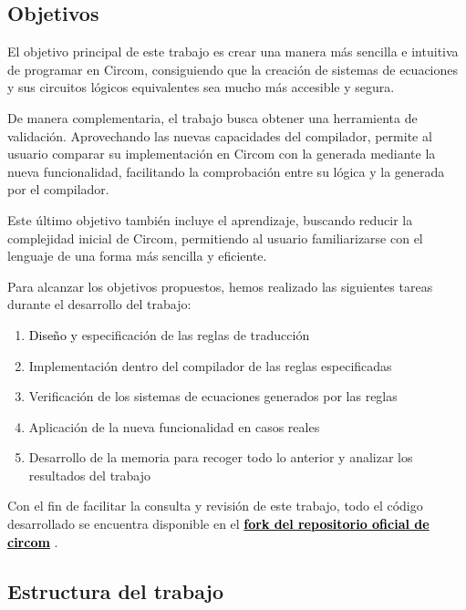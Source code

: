 \documentclass[a4paper,12pt]{report}
\begin{document}
	\subsection{Objetivos}
	
	\noindent El objetivo principal de este trabajo es crear una manera más sencilla e intuitiva de programar en Circom, consiguiendo que la creación de sistemas de ecuaciones y sus circuitos lógicos equivalentes sea mucho más accesible y segura.
	
	\vspace{0.2cm}
	\noindent De manera complementaria, el trabajo busca obtener una herramienta de validación. Aprovechando las nuevas capacidades del compilador, permite al usuario comparar su implementación en Circom con la generada mediante la nueva funcionalidad, facilitando la comprobación entre su lógica y la generada por el compilador.
	
	
	\vspace{0.2cm}
	\noindent Este último objetivo también incluye el aprendizaje, buscando reducir la complejidad inicial de Circom, permitiendo al usuario familiarizarse con el lenguaje de una forma más sencilla y eficiente.
	
	\vspace{0.2cm}
	\noindent Para alcanzar los objetivos propuestos, hemos realizado las siguientes tareas durante el desarrollo del trabajo:
	
	\begin{enumerate}
		\item \textcolor{black}{Diseño y} especificación de las reglas de traducción
		\item Implementación dentro del compilador de las reglas especificadas
		\item Verificación de los sistemas de ecuaciones generados por las reglas
		\item Aplicación de la nueva funcionalidad en casos reales
		\item Desarrollo de la memoria para recoger todo lo anterior y analizar los resultados del trabajo
	\end{enumerate}
	
	\vspace{0.2cm}
	\noindent Con el fin de facilitar la consulta y revisión de este trabajo, todo el código desarrollado se encuentra disponible en el \href{https://github.com/luciamarst/circom_autocomplete}{\textbf{\textcolor{black}{fork del repositorio oficial de circom}}} \cite{circom_autocomplete}.
	
	\subsection{Estructura del trabajo}
	
\end{document}
